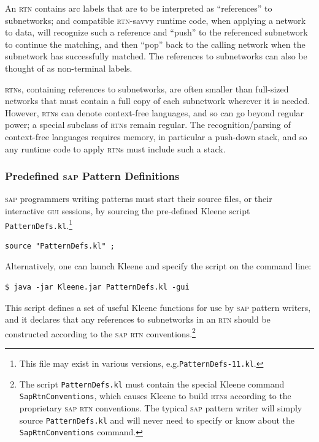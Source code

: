\documentclass[letterpaper,12pt]{article}
\newcommand{\Kleene}{Kleene\xspace}
\newcommand{\acro}{\textsc}
\begin{document}
An \acro{rtn} contains arc labels that are to be interpreted as
``references'' to subnetworks; and compatible \acro{rtn}-savvy runtime
code, when applying a network to data, will recognize such a reference
and ``push'' to the referenced subnetwork to continue the matching, and
then ``pop'' back to the calling network when the subnetwork has
successfully matched.  The references to subnetworks can also be thought
of as non-terminal labels.

\acro{rtn}s, containing references to subnetworks, are often smaller than
full-sized networks that must contain a full copy of each subnetwork
wherever it is needed.  However, \acro{rtn}s can denote context-free
languages, and so can go beyond regular power; a special subclass of
\acro{rtn}s remain regular.  The recognition/parsing of context-free
languages requires memory, in particular a push-down stack, and so any
runtime code to apply \acro{rtn}s must include such a stack.

\subsubsection{Predefined \acro{sap} Pattern Definitions}

\acro{sap} programmers writing patterns must start their source files, or
their interactive \acro{gui} sessions,  by sourcing the pre-defined
Kleene script \verb!PatternDefs.kl!.\footnote{This file may exist in
various versions, e.g.\@ \verb!PatternDefs-11.kl!.}

\begin{Verbatim}[fontsize=\small]
source "PatternDefs.kl" ;
\end{Verbatim}

\noindent
Alternatively, one can launch \Kleene{} and specify the script on the
command line:

\begin{Verbatim}[fontsize=\small]
$ java -jar Kleene.jar PatternDefs.kl -gui
\end{Verbatim}

\noindent
This script defines a set of useful Kleene functions for use by
\acro{sap} pattern writers, and it declares that any references to
subnetworks in an \acro{rtn} should be constructed according to the
\acro{sap} \acro{rtn} conventions.\footnote{The script
\verb!PatternDefs.kl! must contain the special Kleene command
\verb!SapRtnConventions!, which causes Kleene to build \acro{rtn}s
according to the proprietary \acro{sap} \acro{rtn} conventions.  The
typical \acro{sap} pattern writer will simply source
\verb!PatternDefs.kl! and will never need to specify or know about the
\verb!SapRtnConventions! command.} 
\end{document}

